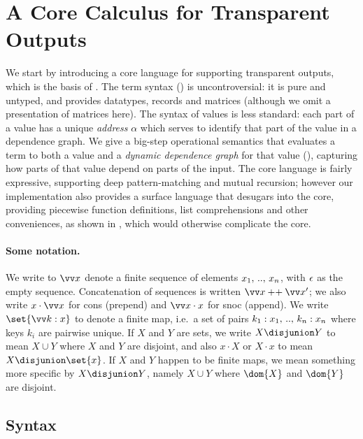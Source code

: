 \section{A Core Calculus for Transparent Outputs}
\label{sec:core}

We start by introducing a core language for supporting transparent outputs, which is the basis of \OurLang.
The term syntax () is uncontroversial: it is pure and untyped, and provides datatypes,
records and matrices (although we omit a presentation of matrices here). The syntax of values is less
standard: each part of a value has a unique \emph{address} $\alpha$ which serves to identify that part of the
value in a dependence graph. We give a big-step operational semantics that evaluates a term to both a value
and a \emph{dynamic dependence graph} for that value (), capturing how parts of that
value depend on parts of the input. The core language is fairly expressive, supporting deep pattern-matching
and mutual recursion; however our implementation also provides a surface language that desugars into the core,
providing piecewise function definitions, list comprehensions and other conveniences, as shown in , which would otherwise complicate the core.

\paragraph{Some notation.} We write to ${\seq{x}}$ denote a finite sequence of elements
${x_1} ,\, .. ,\, {x_n}$, with $\epsilon$ as the empty sequence. Concatenation of sequences is written $\seq{x}
\concat \seq{x}'$; we also write $x \cons \seq{x}$ for cons (prepend) and $\seq{x} \cons x$ for snoc (append).
We write $\set{\seq{\bind{k}{x}}}$ to denote a finite map, i.e.~a set of pairs
${{k_1}:{x_1}} ,\, .. ,\, {{k_n}:{x_n}}$ where keys $k_i$ are pairwise unique. If $X$ and $Y$ are sets,
we write $X \disjunion Y$ to mean $X \cup Y$ where $X$ and $Y$ are disjoint, and also $x \cdot X$ or $X \cdot
x$ to mean $X \disjunion \set{x}$. If $X$ and $Y$ happen to be finite maps, we mean something more specific by
$X \disjunion Y$, namely $X \cup Y$ where $\dom{X}$ and $\dom{Y}$ are disjoint.

\subsection{Syntax}
\label{sec:core:syntax}



